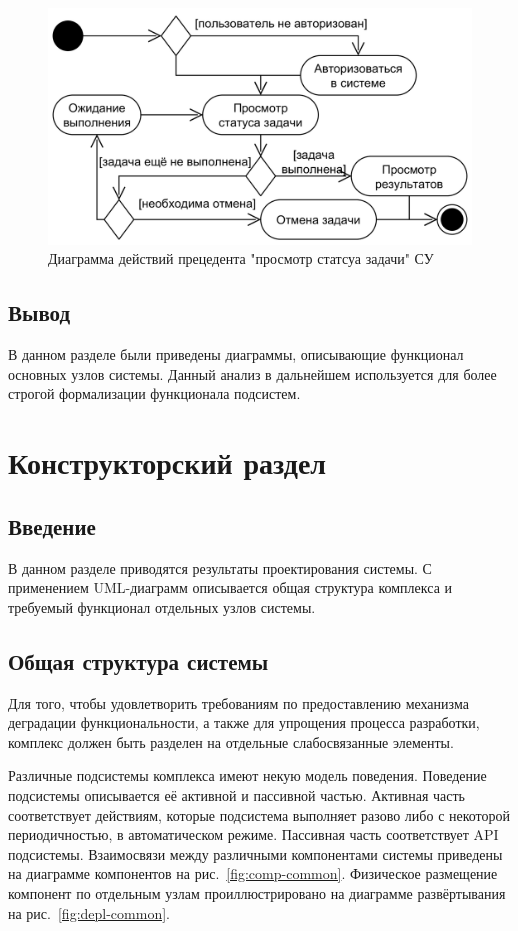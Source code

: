 \documentclass[a4paper,12pt]{report}
\numberwithin{equation}{section}
\begin{document}
  \begin{figure}
    \centering
    \includegraphics[width=\linewidth]{diagrams/logic/activity-view}
    \caption{Диаграмма действий прецедента "просмотр статсуа задачи" СУ}
    \label{fig:logic-view}
  \end{figure}
  
  \subsection{Вывод}
  В данном разделе были приведены диаграммы, описывающие функционал основных узлов системы.
  Данный анализ в дальнейшем используется для более строгой формализации функционала подсистем.
  
  \clearpage
  \section{Конструкторский раздел}
  \subsection{Введение}
  В данном разделе приводятся результаты проектирования системы.
  С применением UML-диаграмм описывается общая структура комплекса и требуемый функционал отдельных узлов системы.
  
  \subsection{Общая структура системы}
  Для того, чтобы удовлетворить требованиям по предоставлению механизма деградации функциональности,
  а также для упрощения процесса разработки, комплекс должен быть разделен на отдельные слабосвязанные элементы.
  
  Различные подсистемы комплекса имеют некую модель поведения.
  Поведение подсистемы описывается её активной и пассивной частью.
  Активная часть соответствует действиям, которые подсистема выполняет разово либо с некоторой периодичностью, в автоматическом режиме.
  Пассивная часть соответствует API подсистемы.
  Взаимосвязи между различными компонентами системы приведены на диаграмме компонентов на рис.~\ref{fig:comp-common}.
  Физическое размещение компонент по отдельным узлам проиллюстрировано на диаграмме развёртывания на рис.~\ref{fig:depl-common}.
  
\end{document}
